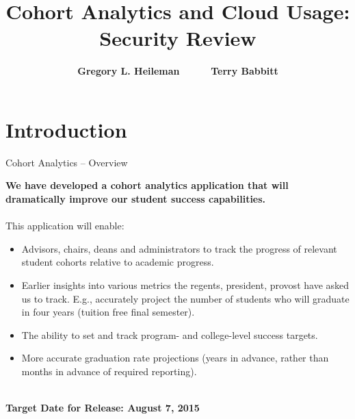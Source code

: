 \documentclass[t,handout]{beamer}   %
\title[Cohort Analytics]
{Cohort Analytics and Cloud Usage: Security Review}
\author[Heileman \& Babbitt] %
{\bf Gregory L. Heileman \ \ \ \ \ Terry Babbitt}
\institute[UNM]
{Application Development Team \\
Academic Affairs \\
University of New Mexico}
\date[June 26, 2015]
\begin{document}
\begin{frame}
  \titlepage
\end{frame}



%

\section{Introduction}

\begin{frame}{Cohort Analytics -- Overview}%

\vspace*{-0.2in}
\textbf{We have developed a cohort analytics application that will dramatically improve our student success capabilities.}~\\~\\
\pause
This application will enable:
\begin{itemize}
\item Advisors, chairs, deans and administrators to track the progress of relevant student cohorts relative to academic progress. 
\pause
\item Earlier insights into various metrics the regents, president, provost have asked us to track.  E.g., accurately project the number of students who will graduate in four years (tuition free final semester).
\pause
\item The ability to set and track program- and college-level success targets.
\pause
\item More accurate graduation rate projections (years in advance, rather than months in advance of required reporting). 
\end{itemize}~\\
\pause
{\bf Target Date for Release: August 7, 2015}
\end{frame}
\end{document}
